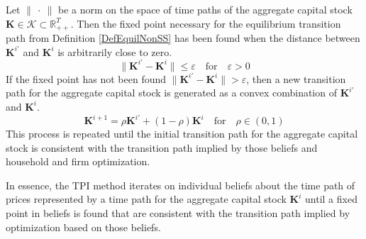 \documentclass[letterpaper,12pt]{article}
\theoremstyle{definition}
\newcommand\ve{\varepsilon}
\providecommand{\norm}[1]{\lVert#1\rVert}
\begin{document}
  Let $\norm{\:\cdot\:}$ be a norm on the space of time paths of the aggregate capital stock $\bm{K}\in\mathcal{K}\subset\mathbb{R}_{++}^T$. Then the fixed point necessary for the equilibrium transition path from Definition \ref{DefEquilNonSS} has been found when the distance between $\bm{K}^{i'}$ and $\bm{K}^{i}$ is arbitrarily close to zero.
  \begin{equation}\label{EqTPIconverge}
    \norm{\bm{K}^{i'} - \bm{K}^{i}} \leq \ve \quad\text{for}\quad \ve>0
  \end{equation}
  If the fixed point has not been found $\norm{\bm{K}^{i'} - \bm{K}^{i}} > \ve$, then a new transition path for the aggregate capital stock is generated as a convex combination of $\bm{K}^{i'}$ and $\bm{K}^{i}$.
  \begin{equation}\label{EqTPInewpath}
    \bm{K}^{i+1} = \rho\bm{K}^{i'} + (1-\rho)\bm{K}^{i} \quad\text{for}\quad \rho\in(0,1)
  \end{equation}
  This process is repeated until the initial transition path for the aggregate capital stock is consistent with the transition path implied by those beliefs and household and firm optimization.

  In essence, the TPI method iterates on individual beliefs about the time path of prices represented by a time path for the aggregate capital stock $\bm{K}^i$ until a fixed point in beliefs is found that are consistent with the transition path implied by optimization based on those beliefs.
\end{document}
